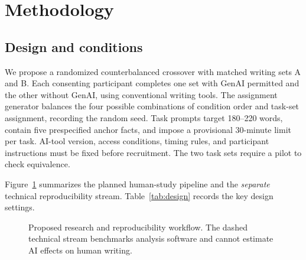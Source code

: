 \section{Methodology}\label{sec:methodology}
\subsection{Design and conditions}
We propose a randomized counterbalanced crossover with matched writing sets A and B. Each consenting participant completes one set with GenAI permitted and the other without GenAI, using conventional writing tools. The assignment generator balances the four possible combinations of condition order and task-set assignment, recording the random seed. Task prompts target 180--220 words, contain five prespecified anchor facts, and impose a provisional 30-minute limit per task. AI-tool version, access conditions, timing rules, and participant instructions must be fixed before recruitment. The two task sets require a pilot to check equivalence.

Figure~\ref{fig:pipeline} summarizes the planned human-study pipeline and the \emph{separate} technical reproducibility stream. Table~\ref{tab:design} records the key design settings.

\begin{figure}[t]
  \centering
  \caption{Proposed research and reproducibility workflow. The dashed technical stream benchmarks analysis software and cannot estimate AI effects on human writing.}
  \label{fig:pipeline}
\end{figure}

